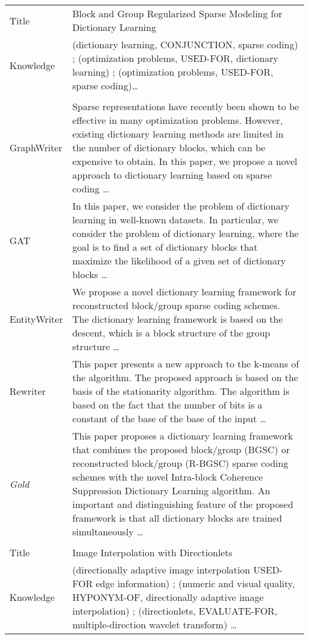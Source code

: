 \documentclass[11pt,a4paper]{article}
\begin{document}
\begin{table*}[t]
\begin{small}
\begin{tabularx}{\textwidth}{lX}
    Title & Block and Group Regularized Sparse Modeling for Dictionary Learning   \\ 
    Knowledge & (dictionary learning, CONJUNCTION, sparse coding) ; (optimization problems, USED-FOR, dictionary learning) ; (optimization problems, USED-FOR, sparse coding)\ldots \\ \hline \\
    GraphWriter & Sparse representations have recently been shown to be effective in many optimization problems. However, existing dictionary learning methods are limited in the number of dictionary blocks, which can be expensive to obtain. In this paper, we propose a novel approach to dictionary learning based on sparse coding  \ldots\\
    GAT &  In this paper, we consider the problem of dictionary learning in well-known datasets. In particular, we consider the problem of dictionary learning, where the goal is to find a set of dictionary blocks that maximize the likelihood of a given set of dictionary blocks \ldots \\
    EntityWriter & We propose a novel dictionary learning framework for reconstructed block/group sparse coding schemes. The dictionary learning framework is based on the descent, which is a block structure of the group structure  \ldots\\ 
    Rewriter & This paper presents a new approach to the k-means of the algorithm. The proposed approach is based on the basis of the stationarity algorithm. The algorithm is based on the fact that the number of bits is a constant of the base of the base of the input  \ldots\\
    {\it Gold} & This paper proposes a dictionary learning framework that combines the proposed block/group (BGSC) or reconstructed block/group (R-BGSC) sparse coding schemes with the novel Intra-block Coherence Suppression Dictionary Learning algorithm. An important and distinguishing feature of the proposed framework is that all dictionary blocks are trained simultaneously \ldots \\ \hline \hline \\
    Title & Image Interpolation with Directionlets \\
    Knowledge & (directionally adaptive image interpolation USED-FOR edge information) ; (numeric and visual quality, HYPONYM-OF, directionally adaptive image interpolation) ; (directionlets, EVALUATE-FOR, multiple-direction wavelet transform) \ldots \\ 

\end{tabularx}
\end{small}
\end{table*}
\end{document}
